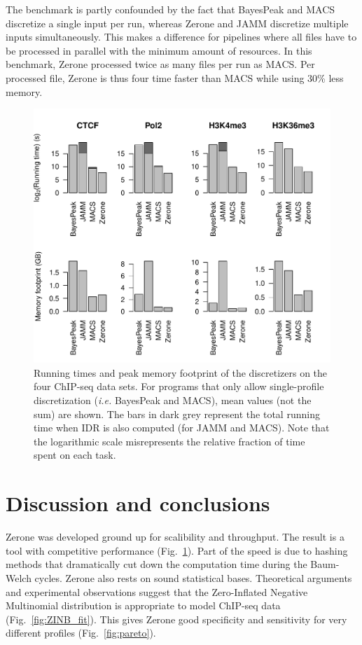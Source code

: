 \documentclass{bioinfo}
\begin{document}
The benchmark is partly confounded by the fact that BayesPeak and MACS
discretize a single input per run, whereas Zerone and JAMM discretize
multiple inputs simultaneously. This makes a difference for pipelines
where all files have to be processed in parallel with the minimum
amount of resources. In this benchmark, Zerone processed twice as
many files per run as MACS. Per processed file, Zerone is thus
four time faster than MACS while using 30\% less memory.

\begin{figure}[!tpb]
\centerline{\includegraphics[scale=0.5]{performance.pdf}}
\caption{
  Running times and peak memory footprint of the
  discretizers on the four ChIP-seq data sets. For programs that only
  allow single-profile discretization (\textit{i.e.} BayesPeak and MACS),
  mean values (not the sum) are shown. The bars in dark grey represent
  the total running time when IDR is also computed (for JAMM and MACS).
  Note that the logarithmic scale misrepresents the relative fraction
  of time spent on each task.
}\label{fig:perf}
\end{figure}

\section{Discussion and conclusions}
Zerone was developed ground up for scalibility and throughput.
The result is a tool with competitive performance (Fig.~\ref{fig:perf}).
Part of the speed is due to hashing methods that dramatically
cut down the computation time during the Baum-Welch cycles. Zerone
also rests on sound statistical bases. Theoretical arguments and
experimental observations suggest that the Zero-Inflated Negative
Multinomial distribution is appropriate to model ChIP-seq data
(Fig.~\ref{fig:ZINB_fit}). This gives Zerone good specificity
and sensitivity for very different profiles (Fig.~\ref{fig:pareto}).
\end{document}
